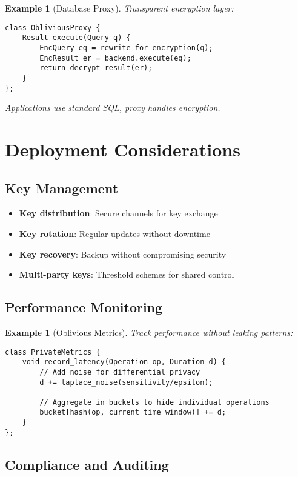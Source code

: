\documentclass[11pt,final,hidelinks]{article}
\newtheorem{example}[theorem]{Example}
\begin{document}
\begin{example}[Database Proxy]
Transparent encryption layer:
\begin{verbatim}
class ObliviousProxy {
    Result execute(Query q) {
        EncQuery eq = rewrite_for_encryption(q);
        EncResult er = backend.execute(eq);
        return decrypt_result(er);
    }
};
\end{verbatim}
Applications use standard SQL, proxy handles encryption.
\end{example}

\section{Deployment Considerations}

\subsection{Key Management}

\begin{itemize}
    \item \textbf{Key distribution}: Secure channels for key exchange
    \item \textbf{Key rotation}: Regular updates without downtime
    \item \textbf{Key recovery}: Backup without compromising security
    \item \textbf{Multi-party keys}: Threshold schemes for shared control
\end{itemize}

\subsection{Performance Monitoring}

\begin{example}[Oblivious Metrics]
Track performance without leaking patterns:
\begin{verbatim}
class PrivateMetrics {
    void record_latency(Operation op, Duration d) {
        // Add noise for differential privacy
        d += laplace_noise(sensitivity/epsilon);
        
        // Aggregate in buckets to hide individual operations
        bucket[hash(op, current_time_window)] += d;
    }
};
\end{verbatim}
\end{example}

\subsection{Compliance and Auditing}
\end{document}
